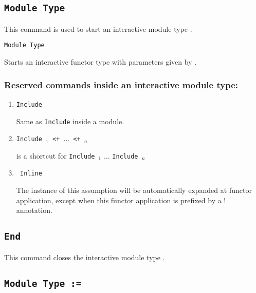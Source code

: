 \subsection{\tt Module Type {\ident}
}

This command is used to start an interactive module type {\ident}.

\begin{Variants}

\item{\tt Module Type {\ident} {\modbindings}}

  Starts an interactive functor type with parameters given by {\modbindings}.

\end{Variants}
\subsubsection{Reserved commands inside an interactive module type:
}
\label{Inline}
\begin{enumerate}
\item {\tt Include {\module}}

 Same as {\tt Include} inside a module.

\item {\tt Include {\module$_1$} \verb.<+. $\ldots$ \verb.<+. {\module$_n$}} 

is a shortcut for {\tt Include {\module$_1$}}  $\ldots$ {\tt Include {\module$_n$}}

\item {\tt {\assumptionkeyword} Inline {\assums} }

 The instance of this assumption will be automatically expanded at functor
 application, except when this functor application is prefixed by a $!$ annotation.
\end{enumerate}
\subsection{\tt End {\ident}
}

This command closes the interactive module type {\ident}.

\begin{ErrMsgs}
\item {}
\end{ErrMsgs}

\subsection{\tt Module Type {\ident} := {\modtype}}

